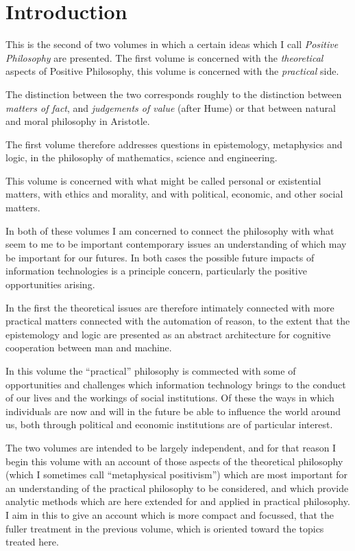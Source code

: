\mainmatter
\chapter{Introduction}

This is the second of two volumes in which a certain ideas which I
call \emph{Positive Philosophy} are presented.
The first volume \cite{rbjb004} is concerned with the
\emph{theoretical} aspects of Positive Philosophy, this volume is
concerned with the \emph{practical} side. 

The distinction between the two corresponds roughly to the distinction
between \emph{matters of fact}, and \emph{judgements of value} (after Hume) or that
between natural and moral philosophy in Aristotle.

The first volume therefore addresses questions in epistemology,
metaphysics and logic, in the philosophy of mathematics, science and
engineering.

This volume is concerned with what might be called personal or
existential matters, with ethics and morality, and with political,
economic, and other social matters.

In both of these volumes I am concerned to connect the philosophy with
what seem to me to be important contemporary issues an understanding
of which may be important for our futures.
In both cases the possible future impacts of information technologies is
a principle concern, particularly the positive opportunities arising.

In the first the theoretical issues are therefore intimately connected
with more practical matters connected with the automation of reason,
to the extent that the epistemology and logic are presented as an
abstract architecture for cognitive cooperation between man and
machine. 

In this volume the ``practical'' philosophy is commected with some of
opportunities and challenges which information technology brings to
the conduct of our lives and the workings of social institutions.
Of these the ways in which individuals are now and will in the future
be able to influence the world around us, both through political and
economic institutions are of particular interest.

The two volumes are intended to be largely independent, and for that
reason I begin this volume with an account of those aspects of the
theoretical philosophy (which I sometimes call ``metaphysical
positivism'') which are most important for an understanding of the
practical philosophy to be considered, and which provide analytic
methods which are here extended for and applied in practical
philosophy. 
I aim in this to give an account which is more compact and focussed,
that the fuller treatment in the previous volume,
which is oriented toward the topics treated here.

